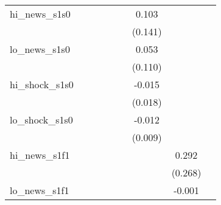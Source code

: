 {\begin{tabular}{l*{8}{c}}
\addlinespace
hi\_news\_s1s0&                     &                     &                     &                     &                     &       0.103         &                     &                     \\
            &                     &                     &                     &                     &                     &     (0.141)         &                     &                     \\
\addlinespace
lo\_news\_s1s0&                     &                     &                     &                     &                     &       0.053         &                     &                     \\
            &                     &                     &                     &                     &                     &     (0.110)         &                     &                     \\
\addlinespace
hi\_shock\_s1s0&                     &                     &                     &                     &                     &      -0.015         &                     &                     \\
            &                     &                     &                     &                     &                     &     (0.018)         &                     &                     \\
\addlinespace
lo\_shock\_s1s0&                     &                     &                     &                     &                     &      -0.012         &                     &                     \\
            &                     &                     &                     &                     &                     &     (0.009)         &                     &                     \\
\addlinespace
hi\_news\_s1f1&                     &                     &                     &                     &                     &                     &       0.292         &                     \\
            &                     &                     &                     &                     &                     &                     &     (0.268)         &                     \\
\addlinespace
lo\_news\_s1f1&                     &                     &                     &                     &                     &                     &      -0.001         &                     \\

\end{tabular}}
